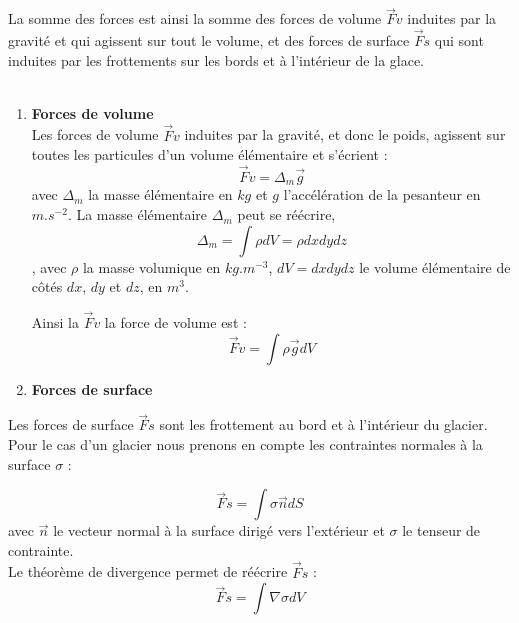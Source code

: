 \documentclass{article}
\begin{document}
La somme des forces est ainsi la somme des forces de volume $\vec{F}v$ induites par la gravité et qui agissent sur tout le volume, et des forces de surface $\vec{F}s$ qui sont induites par les frottements sur les bords et à l'intérieur de la glace.
\\\\
\begin{enumerate}
\item \textbf{Forces de volume}\\
Les forces de volume  $\vec{F}v$ induites par la gravité, et donc le poids, agissent sur toutes les particules d'un volume élémentaire et s'écrient :
\begin{equation}
\vec{F}v = \Delta_{m} \vec{g}
\end{equation}
avec $\Delta_{m}$ la masse élémentaire en $kg$ et $g$ l'accélération de la pesanteur en $m.s^{-2}$.
La masse élémentaire $\Delta_{m}$ peut se réécrire,  
\begin{equation}
\Delta_{m} = \int \rho dV = \rho dxdydz
\end{equation}
, avec $\rho$ la masse volumique en $kg.m^{-3}$, $dV=dxdydz$ le volume élémentaire de côtés $dx$, $dy$ et $dz$, en $m^{3}$.

Ainsi la $\vec{F}v$ la force de volume est : 
\begin{equation}
\vec{F}v = \int \rho \vec{g} dV
\end{equation}

\item \textbf{Forces de surface}\\
\end{enumerate}
Les forces de surface $\vec{F}s$ sont les frottement au bord et à l'intérieur du glacier. Pour le cas d'un glacier nous prenons en compte les contraintes normales à la surface $\sigma$ : 

\begin{equation}
\vec{F}s = \int \sigma \vec{n} dS 
\end{equation}
avec $\vec{n}$ le vecteur normal à la surface dirigé vers l'extérieur et $\sigma$ le tenseur de contrainte.\\
Le théorème de divergence permet de réécrire $\vec{F}s$ :
\begin{equation}
\vec{F}s = \int \nabla \sigma dV 
\label{force surface}
\end{equation}
\end{document}
